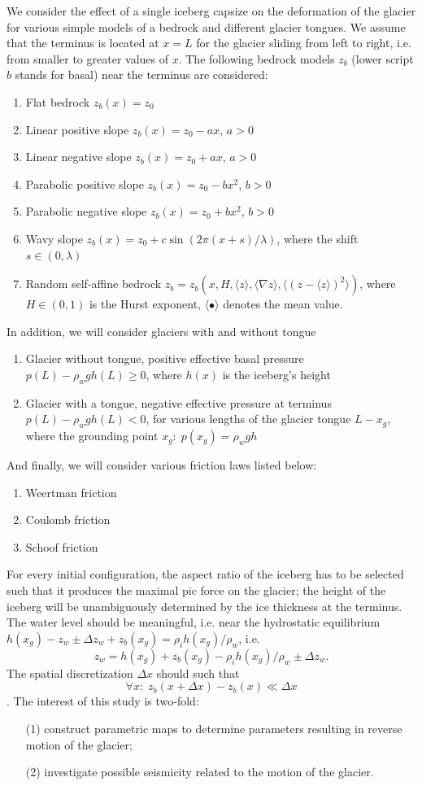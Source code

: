\documentclass[a4paper,11pt]{article}
\begin{document}
We consider the effect of a single iceberg capsize on the deformation of the glacier for various simple models of a bedrock and different glacier tongues.
We assume that the terminus is located at $x=L$ for the glacier sliding from left to right, i.e. from smaller to greater values of $x$.
The following bedrock models $z_b$ (lower script $b$ stands for basal) near the terminus are considered:
\begin{enumerate}
 \item Flat bedrock $z_b(x)  = z_0$ 
 \item Linear positive slope $z_b(x) = z_0 - a x$, $a>0$
 \item Linear negative slope $z_b(x) = z_0 + a x$, $a>0$
 \item Parabolic positive slope $z_b(x) = z_0 - b x^2$, $b>0$
 \item Parabolic negative slope $z_b(x) = z_0 + b x^2$, $b>0$
 \item Wavy slope $z_b(x) = z_0 + c \sin(2\pi (x + s)/\lambda)$, where the shift $s \in (0,\lambda)$
 \item Random self-affine bedrock $z_b = z_b(x,H,\langle z \rangle, \langle \nabla z \rangle, \langle (z - \langle z\rangle)^2 \rangle)$, where $H \in (0,1)$ is the Hurst exponent, $\langle \bullet \rangle$ denotes the mean value.
\end{enumerate}
In addition, we will consider glaciers with and without tongue
\begin{enumerate}
 \item Glacier without tongue, positive effective basal pressure $p(L) - \rho_w g h(L) \ge 0$, where $h(x)$ is the iceberg's height 
 \item Glacier with a tongue, negative effective pressure at terminus $p(L) - \rho_w gh(L) < 0$, for various lengths of the glacier tongue $L-x_g$, where the grounding point $x_g:\; p(x_g) = \rho_w g h$
\end{enumerate}
And finally, we will consider various friction laws listed below:
\begin{enumerate}
 \item Weertman friction
 \item Coulomb friction
 \item Schoof friction
\end{enumerate}
For every initial configuration, the aspect ratio of the iceberg has to be selected such that it produces the maximal pic force on the glacier; the height of the iceberg will be unambiguously determined by the ice thickness at the terminus. 
The water level should be meaningful, i.e. near the hydrostatic equilibrium $h(x_g) - z_w \pm \Delta z_w + z_b(x_g) = \rho_i h(x_g) / \rho_w $, i.e. 
\[z_w = h(x_g) + z_b(x_g) - \rho_i h(x_g) / \rho_w \pm \Delta z_w.\]
The spatial discretization $\Delta x$ should such that \[ \forall x: \; z_b(x+\Delta x) - z_b(x) \ll \Delta x\].
The interest of this study is two-fold: 
\begin{itemize}
 \item[(1)] construct parametric maps to determine parameters resulting in reverse motion of the glacier;
 \item[(2)] investigate possible seismicity related to the motion of the glacier.
\end{itemize}
\end{document}

